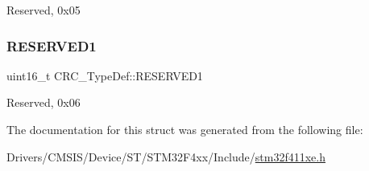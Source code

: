 Reserved, 0x05 \mbox{\label{struct_c_r_c___type_def_a8b205c6e25b1808ac016db2356b3021d}} 
\subsubsection{\texorpdfstring{R\+E\+S\+E\+R\+V\+E\+D1}{RESERVED1}}
{\footnotesize\ttfamily uint16\+\_\+t C\+R\+C\+\_\+\+Type\+Def\+::\+R\+E\+S\+E\+R\+V\+E\+D1}

Reserved, 0x06 

The documentation for this struct was generated from the following file\+:\begin{DoxyCompactItemize}
\item 
Drivers/\+C\+M\+S\+I\+S/\+Device/\+S\+T/\+S\+T\+M32\+F4xx/\+Include/\hyperlink{stm32f411xe_8h}{stm32f411xe.\+h}\end{DoxyCompactItemize}
